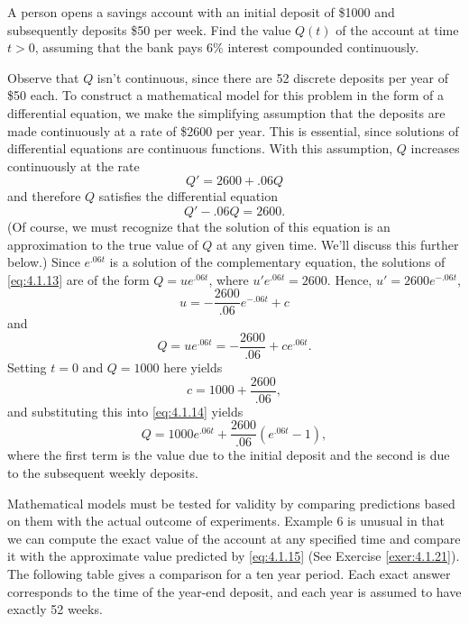 
\vspace*{-.2in}
\noindent
\begin{example}
  \label{example:4.1.6} \rm A person opens a savings account with an initial deposit of \$1000 and
  subsequently deposits \$50 per week. Find the value $Q(t)$ of the account at time $t>0$, assuming
  that the bank pays 6\% interest compounded continuously.
\end{example}

\begin{examplesolution}
\solution Observe that $Q$ isn't continuous, since there are 52 discrete deposits per year of \$50
each. To construct a mathematical model for this problem in the form of a differential equation, we
make the simplifying assumption that the deposits are made continuously at a rate of \$2600 per
year. This is essential, since solutions of differential equations are continuous functions. With
this assumption, $Q$ increases continuously at the rate
\[
  Q'=2600+.06Q
\]
and therefore $Q$ satisfies the differential equation
\begin{equation}
  \label{eq:4.1.13}Q'-.06Q=2600.
\end{equation}
(Of course, we must recognize that the solution of this equation is an approximation to the true
value of $Q$ at any given time. We'll discuss this further below.) Since $e^{.06t}$ is a solution of
the complementary equation, the solutions of \eqref{eq:4.1.13} are of the form $Q=ue^{.06t}$, where
$u'e^{.06t}=2600$. Hence, $u'=2600e^{-.06t}$,
\[
  u=-\frac{2600}{.06}e^{-.06t}+c
\]
and
\begin{equation}
  \label{eq:4.1.14}Q=ue^{.06t}=-\frac{2600}{.06}+ce^{.06t}.
\end{equation}
Setting $t=0$ and $Q=1000$ here yields
\[
  c=1000+\frac{2600}{.06},
\]
and substituting this into \eqref{eq:4.1.14} yields
\begin{equation}
  \label{eq:4.1.15}Q=1000e^{.06t}+\frac{2600}{.06}(e^{.06t}-1),%
\end{equation}
where the first term is the value due to the initial deposit and the second is due to the subsequent
weekly deposits. \bbox
\end{examplesolution}

Mathematical models must be tested for validity by comparing predictions based on them with the
actual outcome of experiments. Example 6 is unusual in that we can compute the exact value of the
account at any specified time and compare it with the approximate value predicted by
\eqref{eq:4.1.15} (See Exercise \ref{exer:4.1.21}). The following table gives a comparison for a
ten year period. Each exact answer corresponds to the time of the year-end deposit, and each year is
assumed to have exactly 52 weeks.

